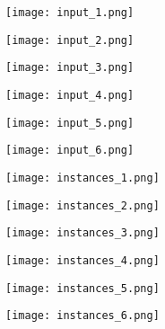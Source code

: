 \documentclass[runningheads]{llncs}
\begin{document}
\begin{figure}[h!]
\begin{subfigure}{\linewidth}
  \begin{subfigure}{0.15\linewidth}
    \texttt{[image: input\_1.png]}
  \end{subfigure}
  \hfill
  \begin{subfigure}{0.15\linewidth}
    \texttt{[image: input\_2.png]}
  \end{subfigure}
  \hfill
  \begin{subfigure}{0.15\linewidth}
    \texttt{[image: input\_3.png]}
  \end{subfigure}
  \hfill
  \begin{subfigure}{0.15\linewidth}
    \texttt{[image: input\_4.png]}
  \end{subfigure}
  \hfill
  \begin{subfigure}{0.15\linewidth}
    \texttt{[image: input\_5.png]}
  \end{subfigure}
  \hfill
  \begin{subfigure}{0.15\linewidth}
    \texttt{[image: input\_6.png]}
  \end{subfigure}
  \hfill
\end{subfigure}
\begin{subfigure}{\linewidth}
  \begin{subfigure}{0.15\linewidth}
    \texttt{[image: instances\_1.png]}
  \end{subfigure}
  \hfill
  \begin{subfigure}{0.15\linewidth}
    \texttt{[image: instances\_2.png]}
  \end{subfigure}
  \hfill
  \begin{subfigure}{0.15\linewidth}
    \texttt{[image: instances\_3.png]}
  \end{subfigure}
  \hfill
  \begin{subfigure}{0.15\linewidth}
    \texttt{[image: instances\_4.png]}
  \end{subfigure}
  \hfill
  \begin{subfigure}{0.15\linewidth}
    \texttt{[image: instances\_5.png]}
  \end{subfigure}
  \hfill
  \begin{subfigure}{0.15\linewidth}
    \texttt{[image: instances\_6.png]}
  \end{subfigure}

\end{subfigure}
\end{figure}
\end{document}
